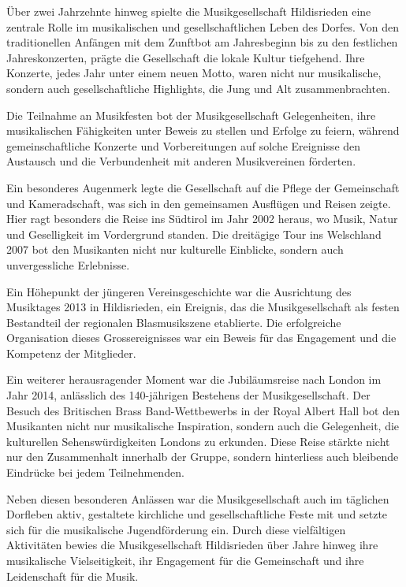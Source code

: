 \begin{history}

    Über zwei Jahrzehnte hinweg spielte die Musikgesellschaft Hildisrieden eine
    zentrale Rolle im musikalischen und gesellschaftlichen Leben des Dorfes. Von
    den traditionellen Anfängen mit dem Zunftbot am Jahresbeginn bis zu den
    festlichen Jahreskonzerten, prägte die Gesellschaft die lokale Kultur
    tiefgehend. Ihre Konzerte, jedes Jahr unter einem neuen Motto, waren nicht
    nur musikalische, sondern auch gesellschaftliche Highlights, die Jung und
    Alt zusammenbrachten.

    Die Teilnahme an Musikfesten bot der Musikgesellschaft Gelegenheiten, ihre
    musikalischen Fähigkeiten unter Beweis zu stellen und Erfolge zu feiern,
    während gemeinschaftliche Konzerte und Vorbereitungen auf solche Ereignisse
    den Austausch und die Verbundenheit mit anderen Musikvereinen förderten.

    Ein besonderes Augenmerk legte die Gesellschaft auf die Pflege der
    Gemeinschaft und Kameradschaft, was sich in den gemeinsamen Ausflügen und
    Reisen zeigte. Hier ragt besonders die Reise ins Südtirol im Jahr 2002
    heraus, wo Musik, Natur und Geselligkeit im Vordergrund standen. Die
    dreitägige Tour ins Welschland 2007 bot den Musikanten nicht nur kulturelle
    Einblicke, sondern auch unvergessliche Erlebnisse.

    Ein Höhepunkt der jüngeren Vereinsgeschichte war die Ausrichtung des
    Musiktages 2013 in Hildisrieden, ein Ereignis, das die Musikgesellschaft als
    festen Bestandteil der regionalen Blasmusikszene etablierte. Die
    erfolgreiche Organisation dieses Grossereignisses war ein Beweis für das
    Engagement und die Kompetenz der Mitglieder.

    Ein weiterer herausragender Moment war die Jubiläumsreise nach London im
    Jahr 2014, anlässlich des 140-jährigen Bestehens der Musikgesellschaft. Der
    Besuch des Britischen Brass Band-Wettbewerbs in der Royal Albert Hall bot
    den Musikanten nicht nur musikalische Inspiration, sondern auch die
    Gelegenheit, die kulturellen Sehenswürdigkeiten Londons zu erkunden. Diese
    Reise stärkte nicht nur den Zusammenhalt innerhalb der Gruppe, sondern
    hinterliess auch bleibende Eindrücke bei jedem Teilnehmenden.

    Neben diesen besonderen Anlässen war die Musikgesellschaft auch im täglichen
    Dorfleben aktiv, gestaltete kirchliche und gesellschaftliche Feste mit und
    setzte sich für die musikalische Jugendförderung ein. Durch diese
    vielfältigen Aktivitäten bewies die Musikgesellschaft Hildisrieden über
    Jahre hinweg ihre musikalische Vielseitigkeit, ihr Engagement für die
    Gemeinschaft und ihre Leidenschaft für die Musik.


\end{history}
